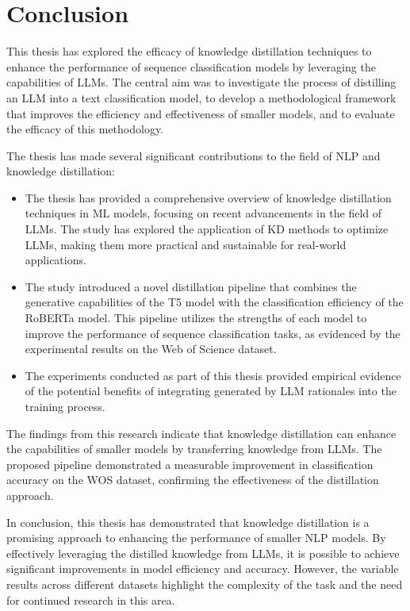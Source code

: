 \chapter{Conclusion}
\label{chap:conclusion}

This thesis has explored the efficacy of knowledge distillation techniques to enhance the performance of sequence classification models by leveraging the capabilities of LLMs. The central aim was to investigate the process of distilling an LLM into a text classification model, to develop a methodological framework that improves the efficiency and effectiveness of smaller models, and to evaluate the efficacy of this methodology.

The thesis has made several significant contributions to the field of NLP and knowledge distillation:
\begin{itemize}
    \item The thesis has provided a comprehensive overview of knowledge distillation techniques in ML models, focusing on recent advancements in the field of LLMs. The study has explored the application of KD methods to optimize LLMs, making them more practical and sustainable for real-world applications.
    \item The study introduced a novel distillation pipeline that combines the generative capabilities of the T5 model with the classification efficiency of the RoBERTa model. This pipeline utilizes the strengths of each model to improve the performance of sequence classification tasks, as evidenced by the experimental results on the Web of Science dataset.
    \item The experiments conducted as part of this thesis provided empirical evidence of the potential benefits of integrating generated by LLM rationales into the training process.
\end{itemize}

The findings from this research indicate that knowledge distillation can enhance the capabilities of smaller models by transferring knowledge from LLMs. The proposed pipeline demonstrated a measurable improvement in classification accuracy on the WOS dataset, confirming the effectiveness of the distillation approach.

In conclusion, this thesis has demonstrated that knowledge distillation is a promising approach to enhancing the performance of smaller NLP models. By effectively leveraging the distilled knowledge from LLMs, it is possible to achieve significant improvements in model efficiency and accuracy. However, the variable results across different datasets highlight the complexity of the task and the need for continued research in this area.
